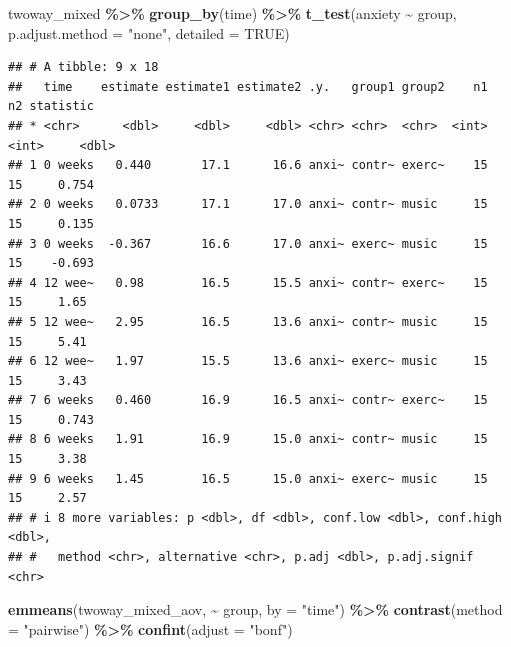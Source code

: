 \documentclass[
]{book}
\newenvironment{Shaded}{\begin{snugshade}}{\end{snugshade}}
\newcommand{\AttributeTok}[1]{\textcolor[rgb]{0.13,0.29,0.53}{#1}}
\newcommand{\ConstantTok}[1]{\textcolor[rgb]{0.56,0.35,0.01}{#1}}
\newcommand{\FunctionTok}[1]{\textcolor[rgb]{0.13,0.29,0.53}{\textbf{#1}}}
\newcommand{\NormalTok}[1]{#1}
\newcommand{\SpecialCharTok}[1]{\textcolor[rgb]{0.81,0.36,0.00}{\textbf{#1}}}
\newcommand{\StringTok}[1]{\textcolor[rgb]{0.31,0.60,0.02}{#1}}
\begin{document}
\begin{Shaded}
\begin{Highlighting}[]
\NormalTok{twoway\_mixed }\SpecialCharTok{\%\textgreater{}\%}
  \FunctionTok{group\_by}\NormalTok{(time) }\SpecialCharTok{\%\textgreater{}\%}
  \FunctionTok{t\_test}\NormalTok{(anxiety }\SpecialCharTok{\textasciitilde{}}\NormalTok{ group, }\AttributeTok{p.adjust.method =} \StringTok{"none"}\NormalTok{, }\AttributeTok{detailed =} \ConstantTok{TRUE}\NormalTok{)}
\end{Highlighting}
\end{Shaded}

\begin{verbatim}
## # A tibble: 9 x 18
##   time    estimate estimate1 estimate2 .y.   group1 group2    n1    n2 statistic
## * <chr>      <dbl>     <dbl>     <dbl> <chr> <chr>  <chr>  <int> <int>     <dbl>
## 1 0 weeks   0.440       17.1      16.6 anxi~ contr~ exerc~    15    15     0.754
## 2 0 weeks   0.0733      17.1      17.0 anxi~ contr~ music     15    15     0.135
## 3 0 weeks  -0.367       16.6      17.0 anxi~ exerc~ music     15    15    -0.693
## 4 12 wee~   0.98        16.5      15.5 anxi~ contr~ exerc~    15    15     1.65 
## 5 12 wee~   2.95        16.5      13.6 anxi~ contr~ music     15    15     5.41 
## 6 12 wee~   1.97        15.5      13.6 anxi~ exerc~ music     15    15     3.43 
## 7 6 weeks   0.460       16.9      16.5 anxi~ contr~ exerc~    15    15     0.743
## 8 6 weeks   1.91        16.9      15.0 anxi~ contr~ music     15    15     3.38 
## 9 6 weeks   1.45        16.5      15.0 anxi~ exerc~ music     15    15     2.57 
## # i 8 more variables: p <dbl>, df <dbl>, conf.low <dbl>, conf.high <dbl>,
## #   method <chr>, alternative <chr>, p.adj <dbl>, p.adj.signif <chr>
\end{verbatim}

\begin{Shaded}
\begin{Highlighting}[]
\FunctionTok{emmeans}\NormalTok{(twoway\_mixed\_aov, }\SpecialCharTok{\textasciitilde{}}\NormalTok{ group, }\AttributeTok{by =} \StringTok{"time"}\NormalTok{) }\SpecialCharTok{\%\textgreater{}\%}
  \FunctionTok{contrast}\NormalTok{(}\AttributeTok{method =} \StringTok{"pairwise"}\NormalTok{) }\SpecialCharTok{\%\textgreater{}\%}
  \FunctionTok{confint}\NormalTok{(}\AttributeTok{adjust =} \StringTok{"bonf"}\NormalTok{)}
\end{Highlighting}
\end{Shaded}
\end{document}
